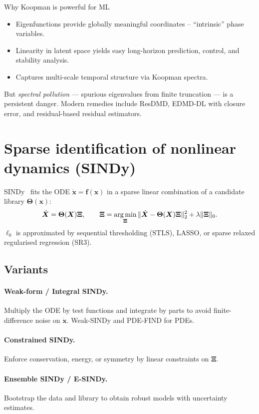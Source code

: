 \begin{insight}{Why Koopman is powerful for ML}
\begin{itemize}
\item Eigenfunctions provide globally meaningful coordinates --
``intrinsic'' phase variables.
\item Linearity in latent space yields easy long-horizon prediction,
control, and stability analysis.
\item Captures multi-scale temporal structure via Koopman spectra.
\end{itemize}
But \emph{spectral pollution} --- spurious eigenvalues from finite
truncation --- is a persistent danger. Modern remedies include
ResDMD, EDMD-DL with closure error, and residual-based residual
estimators.
\end{insight}

\section{Sparse identification of nonlinear dynamics (SINDy)}
SINDy~\cite{brunton2016sindy} fits the ODE
$\dot{\bm{x}}=\bm{f}(\bm{x})$ in a sparse linear combination of a
candidate library $\bm{\Theta}(\bm{x})$:
\begin{equation}
\dot{\bm{X}} = \bm{\Theta}(\bm{X})\bm{\Xi},\qquad
\bm{\Xi}=\operatorname*{arg\,min}_{\bm{\Xi}}\|\dot{\bm{X}}-\bm{\Theta}(\bm{X})\bm{\Xi}\|_2^2 + \lambda\|\bm{\Xi}\|_0.
\end{equation}
$\ell_0$ is approximated by sequential thresholding ($\text{STLS}$),
LASSO, or sparse relaxed regularised regression (SR3).

\subsection{Variants}
\paragraph{Weak-form / Integral SINDy.}
Multiply the ODE by test functions and integrate by parts to avoid
finite-difference noise on $\dot{\bm{x}}$. Weak-SINDy and PDE-FIND for
PDEs.
\paragraph{Constrained SINDy.}
Enforce conservation, energy, or symmetry by linear constraints on
$\bm{\Xi}$.
\paragraph{Ensemble SINDy / E-SINDy.}
Bootstrap the data and library to obtain robust models with uncertainty
estimates.

